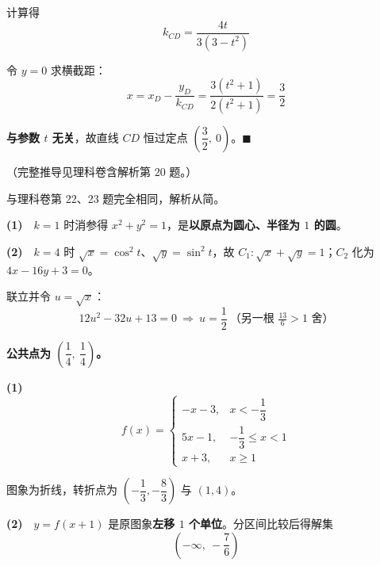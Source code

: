 计算得
\[k_{CD}=\frac{4t}{3\left(3-t^{2}\right)}\]

令 $y=0$ 求横截距：
\[x=x_D-\frac{y_D}{k_{CD}}=\frac{3\left(t^{2}+1\right)}{2\left(t^{2}+1\right)}=\frac32\]

\textbf{与参数 $t$ 无关}，故直线 $CD$ 恒过定点 $\left(\dfrac32,\ 0\right)$。$\blacksquare$

（完整推导见理科卷含解析第 20 题。）

\par\medskip


\begin{gktip}
与理科卷第 22、23 题完全相同，解析从简。
\end{gktip}


\textbf{(1)}　$k=1$ 时消参得 $x^{2}+y^{2}=1$，是\textbf{以原点为圆心、半径为 $1$ 的圆}。

\textbf{(2)}　$k=4$ 时 $\sqrt x=\cos^{2}t$、$\sqrt y=\sin^{2}t$，故 $C_1:\sqrt x+\sqrt y=1$；$C_2$ 化为 $4x-16y+3=0$。

联立并令 $u=\sqrt x$：
\[12u^{2}-32u+13=0\ \Longrightarrow\ u=\frac12\ \text{（另一根 }\tfrac{13}6>1\text{ 舍）}\]

\textbf{公共点为 $\left(\dfrac14,\ \dfrac14\right)$。}

\par\medskip


\textbf{(1)}
\[f(x)=\begin{cases}-x-3,&x<-\dfrac13\\[2mm] 5x-1,&-\dfrac13\le x<1\\[2mm] x+3,&x\ge1\end{cases}\]

图象为折线，转折点为 $\left(-\dfrac13,-\dfrac83\right)$ 与 $(1,4)$。

\textbf{(2)}　$y=f(x+1)$ 是原图象\textbf{左移 $1$ 个单位}。分区间比较后得解集
\[\left(-\infty,\ -\frac76\right)\]

